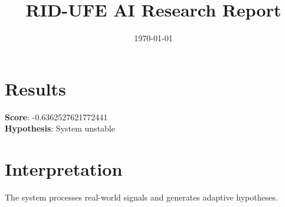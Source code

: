 \documentclass{article}
\title{RID-UFE AI Research Report}
\date{\today}
\begin{document}
\maketitle

\section{Results}

\textbf{Score}: -0.6362527621772441 \\
\textbf{Hypothesis}: System unstable

\section{Interpretation}

The system processes real-world signals and generates adaptive hypotheses.
\end{document}

